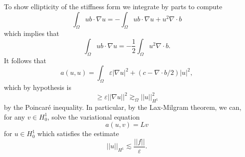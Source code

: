 \documentclass[10pt]{article}
\theoremstyle{definition}
\begin{document}
To show ellipticity of the stiffness form we integrate by parts to compute
$$\int_\Omega ub \cdot \nabla u = -\int_\Omega ub \cdot \nabla u + u^2 \nabla \cdot b$$
which implies that
$$\int_\Omega ub \cdot \nabla u = -\frac{1}{2} \int_\Omega u^2 \nabla \cdot b.$$
It follows that
$$a(u, u) = \int_\Omega \varepsilon |\nabla u|^2 + (c - \nabla \cdot b/2)|u|^2,$$
which by hypothesis is
$$\geq \varepsilon ||\nabla u||^2 \gtrsim_\Omega ||u||_{H^1}^2$$
by the Poincar\'e inequality. In particular, by the Lax-Milgram theorem, we can, for any $v \in H^1_0$, solve the variational equation
$$a(u, v) = Lv$$
for $u \in H^1_0$ which satisfies the estimate
$$||u||_{H^1} \lesssim \frac{||f||}{\varepsilon}.$$
\end{document}
